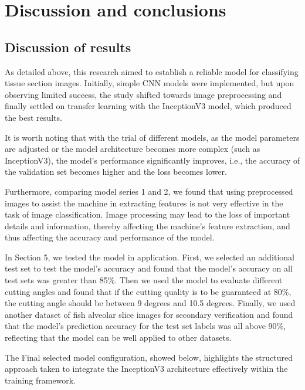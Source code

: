 \section{Discussion and conclusions}
\label{sec:results}

\subsection{Discussion of results}

As detailed above, this research aimed to establish a reliable model for classifying tissue section images. Initially, simple CNN models were implemented, but upon observing limited success, the study shifted towards image preprocessing and finally settled on transfer learning with the InceptionV3 model, which produced the best results.

It is worth noting that with the trial of different models, as the model parameters are adjusted or the model architecture becomes more complex (such as InceptionV3), the model's performance significantly improves, i.e., the accuracy of the validation set becomes higher and the loss becomes lower.

Furthermore, comparing model series 1 and 2, we found that using preprocessed images to assist the machine in extracting features is not very effective in the task of image classification. Image processing may lead to the loss of important details and information, thereby affecting the machine's feature extraction, and thus affecting the accuracy and performance of the model.

In Section 5, we tested the model in application. First, we selected an additional test set to test the model's accuracy and found that the model's accuracy on all test sets was greater than 85\%. Then we used the model to evaluate different cutting angles and found that if the cutting quality is to be guaranteed at 80\%, the cutting angle should be between 9 degrees and 10.5 degrees. Finally, we used another dataset of fish alveolar slice images for secondary verification and found that the model's prediction accuracy for the test set labels was all above 90\%, reflecting that the model can be well applied to other datasets.

The Final selected model configuration, showed below, highlights the structured approach taken to integrate the InceptionV3 architecture effectively within the training framework.


